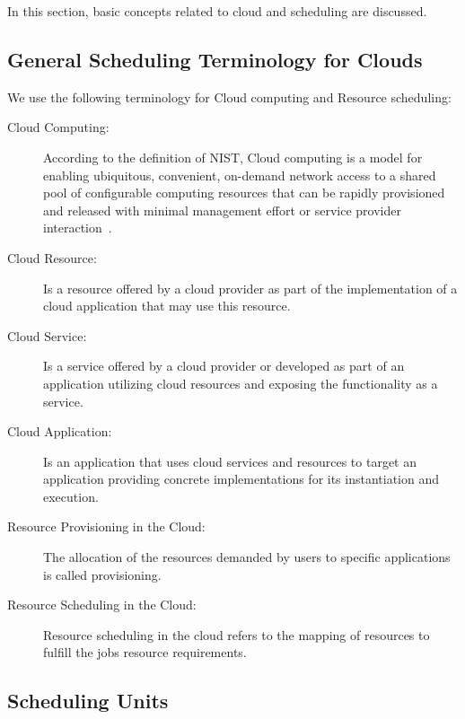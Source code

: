 \documentclass[final,5p,times,twocolumn]{elsarticle}
\begin{document}
\color{red}

In this section, basic concepts related to cloud and scheduling are discussed. 



\color{black}
\subsection{General Scheduling Terminology for Clouds}

We use the following terminology for Cloud computing and Resource scheduling:

\begin{description}

\item[Cloud Computing:] According to the definition of NIST, Cloud computing
  is a model for enabling ubiquitous, convenient, on-demand network
  access to a shared pool of configurable computing resources that can
  be rapidly provisioned and released with minimal management effort
  or service provider interaction~\cite{mell2011nist}.

\item[Cloud Resource:] Is a resource offered by a cloud provider as
  part of the implementation of a cloud application that may use this
  resource.

\item[Cloud Service:] Is a service offered by a cloud provider or
  developed as part of an application utilizing cloud resources and
  exposing the functionality as a service.
  
\item[Cloud Application:] Is an application that uses cloud services
  and resources to target an application providing concrete
  implementations for its instantiation and execution.

\item [Resource Provisioning in the Cloud:] The allocation of the
  resources demanded by users to specific
  applications is called provisioning. 
  
\item [Resource Scheduling in the Cloud:] Resource scheduling in the
  cloud refers to the mapping of resources to fulfill the jobs
  resource requirements.

\end{description}


\subsection{Scheduling Units}
\end{document}
